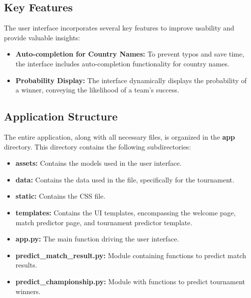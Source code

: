\documentclass[a4paper,12pt]{article}
\begin{document}
\subsection{Key Features}

The user interface incorporates several key features to improve usability and provide valuable insights:

\begin{itemize}
    \item \textbf{Auto-completion for Country Names:} To prevent typos and save time, the interface includes auto-completion functionality for country names.
    \item \textbf{Probability Display:} The interface dynamically displays the probability of a winner, conveying the likelihood of a team's success.
\end{itemize}

\subsection{Application Structure}

The entire application, along with all necessary files, is organized in the \textbf{app} directory. This directory contains the following subdirectories:

\begin{itemize}
    \item \textbf{assets:} Contains the models used in the user interface.
    \item \textbf{data:} Contains the data used in the file, specifically for the tournament.
    \item \textbf{static:} Contains the CSS file.
    \item \textbf{templates:} Contains the UI templates, encompassing the welcome page, match predictor page, and tournament predictor template.
    \item \textbf{app.py:} The main function driving the user interface.
    \item \textbf{predict\_match\_result.py:} Module containing functions to predict match results.
    \item \textbf{predict\_championship.py:} Module with functions to predict tournament winners.
\end{itemize}
\end{document}
